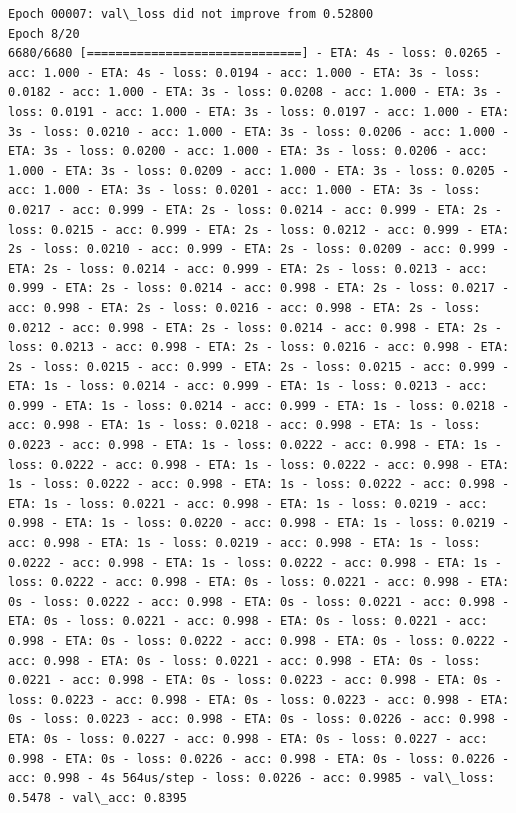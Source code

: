 \documentclass[11pt]{article}
\begin{document}
\begin{Verbatim}[commandchars=\\\{\}]
Epoch 00007: val\_loss did not improve from 0.52800
Epoch 8/20
6680/6680 [==============================] - ETA: 4s - loss: 0.0265 - acc: 1.000 - ETA: 4s - loss: 0.0194 - acc: 1.000 - ETA: 3s - loss: 0.0182 - acc: 1.000 - ETA: 3s - loss: 0.0208 - acc: 1.000 - ETA: 3s - loss: 0.0191 - acc: 1.000 - ETA: 3s - loss: 0.0197 - acc: 1.000 - ETA: 3s - loss: 0.0210 - acc: 1.000 - ETA: 3s - loss: 0.0206 - acc: 1.000 - ETA: 3s - loss: 0.0200 - acc: 1.000 - ETA: 3s - loss: 0.0206 - acc: 1.000 - ETA: 3s - loss: 0.0209 - acc: 1.000 - ETA: 3s - loss: 0.0205 - acc: 1.000 - ETA: 3s - loss: 0.0201 - acc: 1.000 - ETA: 3s - loss: 0.0217 - acc: 0.999 - ETA: 2s - loss: 0.0214 - acc: 0.999 - ETA: 2s - loss: 0.0215 - acc: 0.999 - ETA: 2s - loss: 0.0212 - acc: 0.999 - ETA: 2s - loss: 0.0210 - acc: 0.999 - ETA: 2s - loss: 0.0209 - acc: 0.999 - ETA: 2s - loss: 0.0214 - acc: 0.999 - ETA: 2s - loss: 0.0213 - acc: 0.999 - ETA: 2s - loss: 0.0214 - acc: 0.998 - ETA: 2s - loss: 0.0217 - acc: 0.998 - ETA: 2s - loss: 0.0216 - acc: 0.998 - ETA: 2s - loss: 0.0212 - acc: 0.998 - ETA: 2s - loss: 0.0214 - acc: 0.998 - ETA: 2s - loss: 0.0213 - acc: 0.998 - ETA: 2s - loss: 0.0216 - acc: 0.998 - ETA: 2s - loss: 0.0215 - acc: 0.999 - ETA: 2s - loss: 0.0215 - acc: 0.999 - ETA: 1s - loss: 0.0214 - acc: 0.999 - ETA: 1s - loss: 0.0213 - acc: 0.999 - ETA: 1s - loss: 0.0214 - acc: 0.999 - ETA: 1s - loss: 0.0218 - acc: 0.998 - ETA: 1s - loss: 0.0218 - acc: 0.998 - ETA: 1s - loss: 0.0223 - acc: 0.998 - ETA: 1s - loss: 0.0222 - acc: 0.998 - ETA: 1s - loss: 0.0222 - acc: 0.998 - ETA: 1s - loss: 0.0222 - acc: 0.998 - ETA: 1s - loss: 0.0222 - acc: 0.998 - ETA: 1s - loss: 0.0222 - acc: 0.998 - ETA: 1s - loss: 0.0221 - acc: 0.998 - ETA: 1s - loss: 0.0219 - acc: 0.998 - ETA: 1s - loss: 0.0220 - acc: 0.998 - ETA: 1s - loss: 0.0219 - acc: 0.998 - ETA: 1s - loss: 0.0219 - acc: 0.998 - ETA: 1s - loss: 0.0222 - acc: 0.998 - ETA: 1s - loss: 0.0222 - acc: 0.998 - ETA: 1s - loss: 0.0222 - acc: 0.998 - ETA: 0s - loss: 0.0221 - acc: 0.998 - ETA: 0s - loss: 0.0222 - acc: 0.998 - ETA: 0s - loss: 0.0221 - acc: 0.998 - ETA: 0s - loss: 0.0221 - acc: 0.998 - ETA: 0s - loss: 0.0221 - acc: 0.998 - ETA: 0s - loss: 0.0222 - acc: 0.998 - ETA: 0s - loss: 0.0222 - acc: 0.998 - ETA: 0s - loss: 0.0221 - acc: 0.998 - ETA: 0s - loss: 0.0221 - acc: 0.998 - ETA: 0s - loss: 0.0223 - acc: 0.998 - ETA: 0s - loss: 0.0223 - acc: 0.998 - ETA: 0s - loss: 0.0223 - acc: 0.998 - ETA: 0s - loss: 0.0223 - acc: 0.998 - ETA: 0s - loss: 0.0226 - acc: 0.998 - ETA: 0s - loss: 0.0227 - acc: 0.998 - ETA: 0s - loss: 0.0227 - acc: 0.998 - ETA: 0s - loss: 0.0226 - acc: 0.998 - ETA: 0s - loss: 0.0226 - acc: 0.998 - 4s 564us/step - loss: 0.0226 - acc: 0.9985 - val\_loss: 0.5478 - val\_acc: 0.8395


\end{Verbatim}
\end{document}
